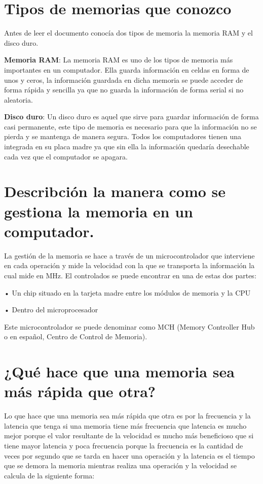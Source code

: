 \documentclass{article}
\begin{document}
\section{Tipos de memorias que conozco} \label{contenido}
Antes de leer el documento conocía dos tipos de memoria la memoria RAM y el disco duro.

 \textbf{Memoria RAM}: La memoria RAM es uno de los tipos de memoria más importantes en un computador. Ella guarda información en celdas en forma de unos y ceros, la información guardada en dicha memoria se puede acceder de forma rápida y sencilla ya que no guarda la información de forma serial si no aleatoria.\cite{sistema}
 
 \textbf{Disco duro}: Un disco duro es aquel que sirve para guardar información de forma casi permanente, este tipo de memoria es necesario para que la información no se pierda y se mantenga de manera segura. Todos los computadores tienen una integrada en su placa madre ya que sin ella la información quedaría desechable cada vez que el computador se apagara. \cite{Disco_Duro}

\section{Describción la manera como se gestiona la memoria en un computador.}
La gestión de la memoria se hace a través de un microcontrolador que interviene en cada operación y mide la velocidad con la que se transporta la información la cual mide en MHz. El controlados se puede encontrar en una de estas dos partes:

•	 Un chip situado en la tarjeta madre entre los módulos de memoria y la CPU

•	Dentro del microprocesador 

Este microcontrolador se puede denominar como MCH (Memory Controller Hub o en español, Centro de Control de Memoria).


\section{¿Qué hace que una memoria sea más rápida que otra?}
Lo que hace que una memoria sea más rápida que otra es por la frecuencia y la latencia que tenga si una memoria tiene más frecuencia que latencia es mucho mejor porque el valor resultante de la velocidad es mucho más beneficioso que si tiene mayor latencia y poca frecuencia porque la frecuencia es la  cantidad de veces por segundo que se tarda en hacer una operación y la latencia es el tiempo que se demora la memoria mientras realiza una operación y la velocidad se calcula de la siguiente forma: \cite{frecuencia_latencia}
\end{document}

